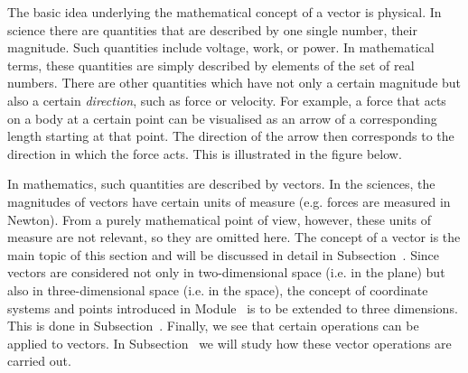 
\Mtikzexternalize




\begin{MSectionStart}

\MModstartBox
\end{MSectionStart}


\begin{MIntro}

The basic idea underlying the mathematical concept of a vector is physical. In science there are quantities
that are described by one single number, their magnitude. Such quantities include voltage, work, 
or power. In mathematical terms, these quantities are simply described by elements of the set of real numbers. 
There are other quantities which have not only a certain magnitude but also a certain \textit{direction}, 
such as force or velocity. For example, a force that acts on a body at a certain point can be visualised as 
an arrow of a corresponding length starting at that point. The direction of the arrow then corresponds to the direction 
in which the force acts. This is illustrated in the figure below.

\begin{center}
%
\end{center}

In mathematics, such quantities are described by vectors. In the sciences, the magnitudes of vectors have certain 
units of measure (e.g. forces are measured in Newton). From a purely mathematical point of view, however, these units of 
measure are not relevant, so they are omitted here. The concept of a vector is the main topic of 
this section and will be discussed in detail in Subsection~. Since vectors are considered not only 
in two-dimensional space (i.e. in the plane) but also in three-dimensional space (i.e. in the space), the concept 
of coordinate systems and points introduced in Module~ is to be extended to three dimensions.
This is done in Subsection~. Finally, we see that certain operations can be applied
to vectors. In Subsection~ we will study how these vector operations are carried out. 
\end{MIntro}

